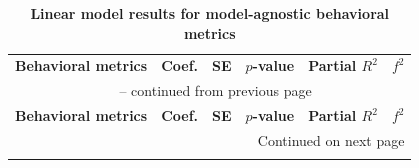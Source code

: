 \begingroup
    \renewcommand{\arraystretch}{1.0}
    \footnotesize
    \begin{longtable}{l r r r r r}
        \captionsetup{labelfont=bf}
        \caption{\textbf{Linear model results for model-agnostic behavioral metrics}}
        \label{tab:lm_behavior_main} \\
        \toprule
        \textbf{Behavioral metrics} & 
        \multicolumn{1}{c}{\textbf{Coef.}} & 
        \multicolumn{1}{c}{\textbf{SE}} & 
        \multicolumn{1}{c}{\textbf{$p$-value}} & 
        \multicolumn{1}{c}{\textbf{Partial $R^2$}} & 
        \multicolumn{1}{c}{\textbf{$f^2$}} \\
        \midrule
        \endfirsthead

        \multicolumn{6}{c}{{\tablename\ \thetable{} -- continued from previous page}} \\
        \toprule
        \textbf{Behavioral metrics} & 
        \multicolumn{1}{c}{\textbf{Coef.}} & 
        \multicolumn{1}{c}{\textbf{SE}} & 
        \multicolumn{1}{c}{\textbf{$p$-value}} & 
        \multicolumn{1}{c}{\textbf{Partial $R^2$}} & 
        \multicolumn{1}{c}{\textbf{$f^2$}} \\
        \midrule
        \endhead

        \midrule
        \multicolumn{6}{r}{{Continued on next page}} \\
        \endfoot


\end{longtable}
